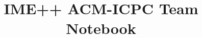\documentclass[a4paper,10pt]{article}
\title{\vspace{-4ex}\Large{IME++ ACM-ICPC Team Notebook}}
\author{}
\date{}
\begin{document}
\begin{landscape}
\begin{multicols}{3}

\maketitle
\vspace{-13ex}
\tableofcontents
\pagestyle{fancy}




\end{multicols}



\end{landscape}
\end{document}
